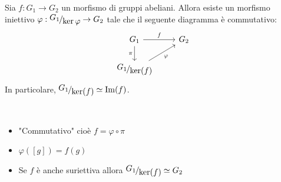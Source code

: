 \documentclass[../main.tex]{subfiles}
\begin{document}
\begin{theorem}
    Sia $f: G_1 \rightarrow G_2$ un morfismo di gruppi abeliani. Allora esiste un morfismo iniettivo $\varphi : \nicefrac{G_1}{\ker \varphi} \rightarrow G_2$ tale che il seguente diagramma è commutativo:
    \begin{equation*}
        \begin{tikzcd}
            G_1 \arrow[r, "f"] \arrow[d, "\pi"'] & G_2 \\
            \nicefrac{G_1}{\ker(f)} \arrow[ru, "\varphi"']
        \end{tikzcd}
    \end{equation*}
    In particolare, $\nicefrac{G_1}{\ker(f)} \simeq \Im(f)$.
    \begin{note}\
        \begin{itemize}
            \item "Commutativo" cioè $f = \varphi \circ \pi$
            \item $\varphi ([g]) = f(g)$
            \item Se $f$ è anche suriettiva allora $\nicefrac{G_1}{\ker(f)} \simeq G_2$
        \end{itemize}
    \end{note}
\end{theorem}
\end{document}
